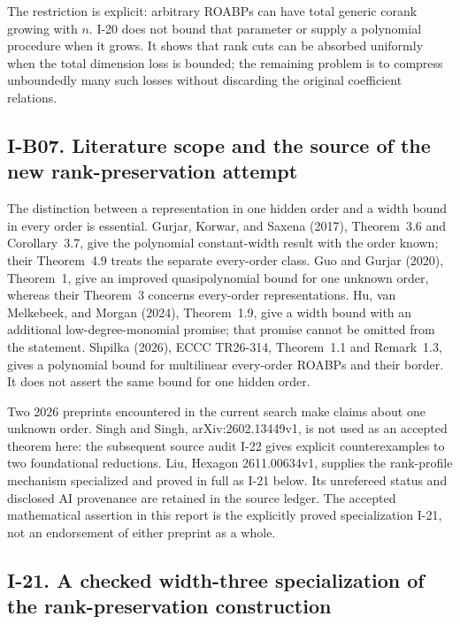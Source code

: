 \documentclass[11pt,a4paper]{article}
\theoremstyle{definition}\newtheorem{definition}{Definition}
\begin{document}
The restriction is explicit: arbitrary ROABPs can have total
generic corank growing with $n$.  I-20 does not bound that parameter
or supply a polynomial procedure when it grows.  It shows that
rank cuts can be absorbed uniformly when the total dimension loss
is bounded; the remaining problem is to compress unboundedly many
such losses without discarding the original coefficient relations.

\subsection{I-B07. Literature scope and the source of the new rank-preservation attempt}
\label{I-B07}

The distinction between a representation in one hidden order and a
width bound in every order is essential.  Gurjar, Korwar, and Saxena
(2017), Theorem~3.6 and Corollary~3.7, give the polynomial
constant-width result with the order known; their Theorem~4.9 treats
the separate every-order class.  Guo and Gurjar (2020), Theorem~1,
give an improved quasipolynomial bound for one unknown order,
whereas their Theorem~3 concerns every-order representations.
Hu, van Melkebeek, and Morgan (2024), Theorem~1.9, give a width
bound with an additional low-degree-monomial promise; that promise
cannot be omitted from the statement.  Shpilka (2026), ECCC
TR26-314, Theorem~1.1 and Remark~1.3, gives a polynomial bound for
multilinear every-order ROABPs and their border.  It does not
assert the same bound for one hidden order.

Two 2026 preprints encountered in the current search make claims
about one unknown order.  Singh and Singh, arXiv:2602.13449v1, is
not used as an accepted theorem here: the subsequent source audit
I-22 gives explicit counterexamples to two foundational reductions.  Liu, Hexagon 2611.00634v1, supplies the rank-profile
mechanism specialized and proved in full as I-21 below.  Its
unrefereed status and disclosed AI provenance are retained in the
source ledger.  The accepted mathematical assertion in this report
is the explicitly proved specialization I-21, not an endorsement
of either preprint as a whole.

\subsection{I-21. A checked width-three specialization of the rank-preservation construction}
\label{I-21}
\end{document}
